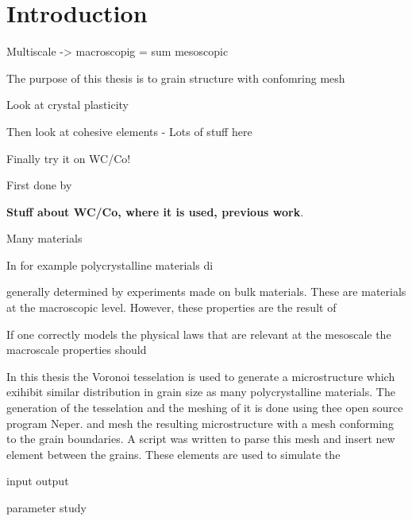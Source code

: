 \documentclass[introduction.tex]{subfiles}
\begin{document}
\chapter{Introduction}

Multiscale -> macroscopig = sum mesoscopic


The purpose of this thesis is to grain structure with confomring mesh

Look at crystal plasticity

Then look at cohesive elements
- Lots of stuff here


Finally try it on WC/Co!

First done by 

\textbf{Stuff about WC/Co, where it is used, previous work}.

Many materials

In for example polycrystalline materials di


generally determined by experiments made on bulk materials. These are materials at the macroscopic level. However, these properties
are the result of 

If one correctly models the physical laws that are relevant at the mesoscale the macroscale properties should 

In this thesis the Voronoi tesselation is used to generate a microstructure which exihibit similar distribution in grain size as many polycrystalline materials. 
The generation of the tesselation and the meshing of it is done using thee open source program Neper.
 and mesh the resulting microstructure with a mesh conforming to the grain boundaries. A script was written to parse this mesh
 and insert new element between the grains. These elements are used to simulate the 

input
output

parameter study
\end{document}
